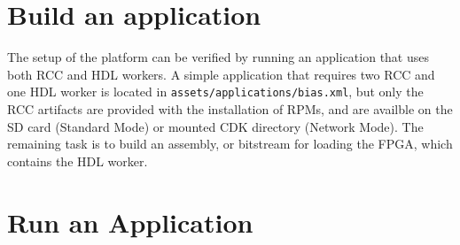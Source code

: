 \pagebreak
\section{Build an application}
\begin{flushleft}
The setup of the platform can be verified by running an application that uses both RCC and HDL workers. A simple application that requires two RCC and one HDL worker is located in \texttt{assets/applications/bias.xml}, but only the RCC artifacts are provided with the installation of RPMs, and are availble on the SD card (Standard Mode) or mounted CDK directory (Network Mode). The remaining task is to build an assembly, or bitstream for loading the FPGA, which contains the HDL worker.
\end{flushleft}

\section{Run an Application}
